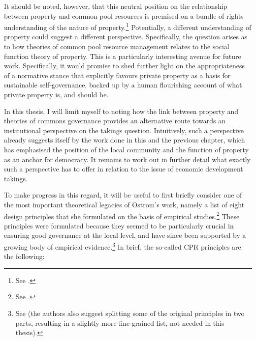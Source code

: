 It should be noted, however, that this neutral position on the relationship between property and common pool resources is premised on a bundle of rights understanding of the nature of property.\footnote{See \cite[59]{ostrom10b}.} Potentially, a different understanding of property could suggest a different perspective. Specifically, the question arises as to how theories of common pool resource management relates to the social function theory of property. This is a particularly interesting avenue for future work. Specifically, it would promise to shed further light on the appropriateness of a normative stance that explicitly favours private property as a basis for sustainable self-governance, backed up by a human flourishing account of what private property is, and should be. 

In this thesis, I will limit myself to noting how the link between property and theories of commons governance provides an alternative route towards an institutional perspective on the takings question. Intuitively, such a perspective already suggests itself by the work done in this and the previous chapter, which has emphasised the position of the local community and the function of property as an anchor for democracy. It remains to work out in further detail what exactly such a perspective has to offer in relation to the issue of economic development takings.

To make progress in this regard, it will be useful to first briefly consider one of the most important theoretical legacies of Ostrom's work, namely a list of eight design principles that she formulated on the basis of empirical studies.\footnote{See \cite[90]{ostrom90}.} These principles were formulated because they seemed to be particularly crucial in ensuring good governance at the local level, and have since been supported by a growing body of empirical evidence.\footnote{See \cite{cox10} (the authors also suggest splitting some of the original principles in two parts, resulting in a slightly more fine-grained list, not needed in this thesis). } In brief, the so-called CPR principles are the following:

